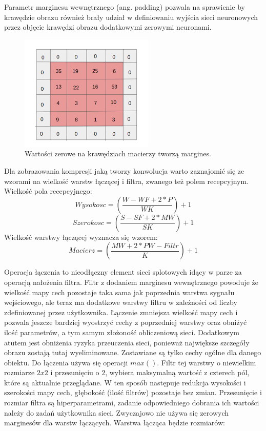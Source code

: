 \documentclass[12pt,a4paper,twoside,titlepage,openright]{book}
\begin{document}
Parametr marginesu wewnętrznego (ang. padding) pozwala na sprawienie by krawędzie obrazu również brały udział w definiowaniu wyjścia sieci neuronowych przez objęcie krawędzi obrazu dodatkowymi zerowymi neuronami. 

\begin{figure}[ht]
	\centering
			\includegraphics[resolution=100]{Padding.png}
		\caption{Wartości zerowe na krawędziach macierzy tworzą margines.}
\end{figure}

Dla zobrazowania kompresji jaką tworzy konwolucja warto zaznajomić się ze wzorami na wielkość warstw łączącej i filtra, zwanego też polem recepcyjnym.
Wielkość pola recepcyjnego: 
$$ Wysokosc = (\frac{W - WF + 2 * P}{WK}) + 1 $$ 
$$ Szerokosc = (\frac{S - SF + 2 * MW}{SK}) + 1 $$
Wielkość warstwy łączącej wyznacza się wzorem:
$$ Macierz = (\frac{MW + 2 * PW - Filtr}{K}) + 1 $$

Operacja łączenia to nieodłączny element sieci splotowych idący w parze za operacją nałożenia filtra. Filtr z dodaniem marginesu wewnętrznego  powoduje że wielkość mapy cech pozostaje taka sama jak poprzednia warstwa sygnału wejściowego, ale teraz ma dodatkowe warstwy filtru w zależności od liczby zdefiniowanej przez użytkownika. Łączenie zmniejsza wielkość mapy cech i pozwala jeszcze bardziej wyostrzyć cechy z poprzedniej warstwy oraz obniżyć ilość parametrów, a tym samym złożoność obliczeniową sieci. Dodatkowym atutem jest obniżenia ryzyka przeuczenia sieci, ponieważ największe szczegóły obrazu zostają tutaj wyeliminowane. Zostawiane są tylko cechy ogólne dla danego obiektu. Do łączenia używa się operacji $max()$. Filtr tej warstwy o niewielkim rozmiarze $2x2$ i przesunięciu o $2$, wybiera maksymalną wartość z czterech pól, które są aktualnie przeglądane. W ten sposób następuje redukcja wysokości i szerokości mapy cech, głębokość (ilość filtrów) pozostaje  bez zmian. Przesunięcie i rozmiar filtra są hiperparametrami, zadanie odpowiedniego dobrania ich wartości należy do zadań użytkownika sieci. Zwyczajowo nie używa się zerowych marginesów dla warstw łączących. Warstwa łącząca będzie rozmiarów:
\end{document}
